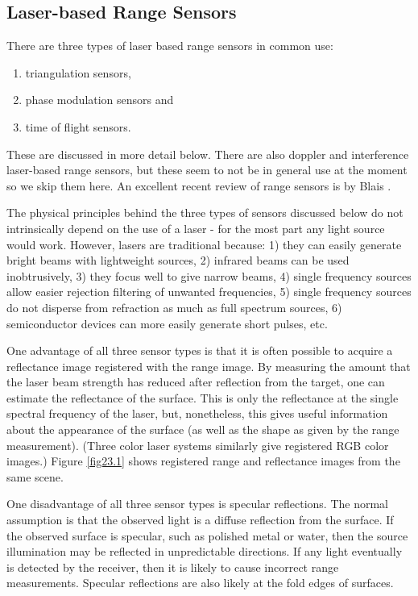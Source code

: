 \documentclass[twocolumn,oneside]{book}
\begin{document}
\subsection{Laser-based Range Sensors} 

There are three types of laser based range sensors in common use:
\begin{enumerate}
\item triangulation sensors,
\item phase modulation sensors and
\item time of flight sensors.
\end{enumerate}
These are discussed in more detail below.
There are also doppler and interference laser-based range
sensors, but these seem to not be in general use at the moment so we 
skip them here.
An excellent recent review of range sensors is by Blais  \cite{blais}.

The physical principles behind the three types of sensors discussed below do
not intrinsically depend on the use of a laser - for the most part any light 
source would work.
However, lasers are traditional because: 
1) they can easily generate bright beams with lightweight sources,
2) infrared beams can be used inobtrusively, 
3) they focus well to give narrow beams, 
4) single frequency sources allow easier rejection filtering of unwanted frequencies,
5) single frequency sources do not disperse from refraction as much as
   full spectrum sources,
6) semiconductor devices can more easily generate short pulses, etc.

One advantage of all three sensor types is that it is often
possible to acquire a
reflectance image registered with the range image.
By measuring the amount that the laser beam strength has reduced after
reflection from the target, one can estimate the reflectance of the
surface. This is only the reflectance at the single spectral frequency of the
laser, but, nonetheless, this gives useful information about the appearance
of the surface (as well as the shape as given by the range measurement).
(Three color laser systems \cite{Baribeau} similarly give registered RGB color 
images.)
Figure \ref{fig23.1} shows registered range and reflectance images from the same scene.

One disadvantage of all three sensor types is specular reflections.
The normal assumption is that the observed light is a diffuse reflection
from the surface.
If the observed surface is specular, such as polished metal or water, then
the source illumination may be reflected in unpredictable directions.
If any light eventually is detected by the receiver, then it is likely to
cause incorrect range measurements.
Specular reflections are also likely at the fold edges of surfaces.
\end{document}
